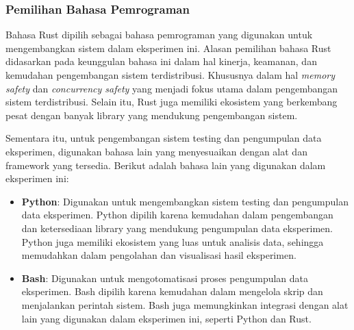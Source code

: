 \subsubsection{Pemilihan Bahasa Pemrograman}
\label{subsubsection:pilihan-bahasa-pemrograman}

Bahasa Rust dipilih sebagai bahasa pemrograman yang digunakan untuk mengembangkan sistem dalam eksperimen ini. Alasan pemilihan bahasa Rust didasarkan pada keunggulan bahasa ini dalam hal kinerja, keamanan, dan kemudahan pengembangan sistem terdistribusi. Khususnya dalam hal \textit{memory safety} dan \textit{concurrency safety} yang menjadi fokus utama dalam pengembangan sistem terdistribusi. Selain itu, Rust juga memiliki ekosistem yang berkembang pesat dengan banyak library yang mendukung pengembangan sistem.

Sementara itu, untuk pengembangan sistem testing dan pengumpulan data eksperimen, digunakan bahasa lain yang menyesuaikan dengan alat dan framework yang tersedia. Berikut adalah bahasa lain yang digunakan dalam eksperimen ini:
\begin{itemize}
    \item \textbf{Python}: Digunakan untuk mengembangkan sistem testing dan pengumpulan data eksperimen. Python dipilih karena kemudahan dalam pengembangan dan ketersediaan library yang mendukung pengumpulan data eksperimen. Python juga memiliki ekosistem yang luas untuk analisis data, sehingga memudahkan dalam pengolahan dan visualisasi hasil eksperimen.
    \item \textbf{Bash}: Digunakan untuk mengotomatisasi proses pengumpulan data eksperimen. Bash dipilih karena kemudahan dalam mengelola skrip dan menjalankan perintah sistem. Bash juga memungkinkan integrasi dengan alat lain yang digunakan dalam eksperimen ini, seperti Python dan Rust.
\end{itemize}